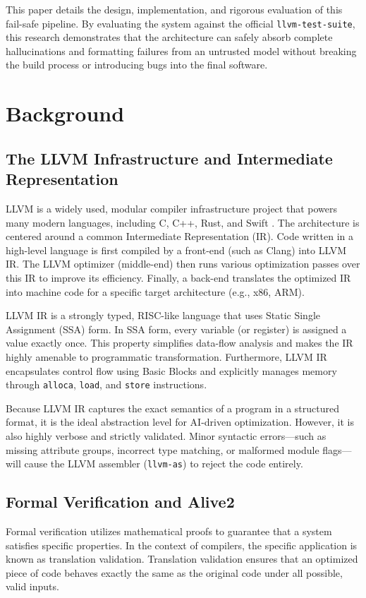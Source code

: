 \documentclass[conference,10pt]{IEEEtran}
\begin{document}
This paper details the design, implementation, and rigorous evaluation of this fail-safe pipeline. By evaluating the system against the official \texttt{llvm-test-suite}, this research demonstrates that the architecture can safely absorb complete hallucinations and formatting failures from an untrusted model without breaking the build process or introducing bugs into the final software. 

\section{Background}

\subsection{The LLVM Infrastructure and Intermediate Representation}
LLVM is a widely used, modular compiler infrastructure project that powers many modern languages, including C, C++, Rust, and Swift \cite{lattner2004llvm}. The architecture is centered around a common Intermediate Representation (IR). Code written in a high-level language is first compiled by a front-end (such as Clang) into LLVM IR. The LLVM optimizer (middle-end) then runs various optimization passes over this IR to improve its efficiency. Finally, a back-end translates the optimized IR into machine code for a specific target architecture (e.g., x86, ARM).

LLVM IR is a strongly typed, RISC-like language that uses Static Single Assignment (SSA) form. In SSA form, every variable (or register) is assigned a value exactly once. This property simplifies data-flow analysis and makes the IR highly amenable to programmatic transformation. Furthermore, LLVM IR encapsulates control flow using Basic Blocks and explicitly manages memory through \texttt{alloca}, \texttt{load}, and \texttt{store} instructions.

Because LLVM IR captures the exact semantics of a program in a structured format, it is the ideal abstraction level for AI-driven optimization. However, it is also highly verbose and strictly validated. Minor syntactic errors—such as missing attribute groups, incorrect type matching, or malformed module flags—will cause the LLVM assembler (\texttt{llvm-as}) to reject the code entirely.

\subsection{Formal Verification and Alive2}
Formal verification utilizes mathematical proofs to guarantee that a system satisfies specific properties. In the context of compilers, the specific application is known as translation validation. Translation validation ensures that an optimized piece of code behaves exactly the same as the original code under all possible, valid inputs.
\end{document}
